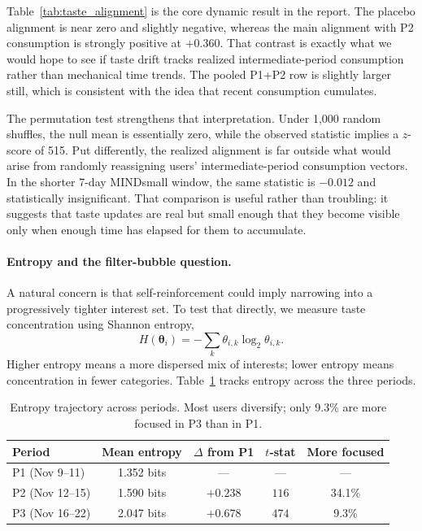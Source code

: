 \documentclass[11pt]{article}
\begin{document}
Table~\ref{tab:taste_alignment} is the core dynamic result in the report. The placebo alignment is near zero and slightly negative, whereas the main alignment with P2 consumption is strongly positive at $+0.360$. That contrast is exactly what we would hope to see if taste drift tracks realized intermediate-period consumption rather than mechanical time trends. The pooled P1+P2 row is slightly larger still, which is consistent with the idea that recent consumption cumulates.

The permutation test strengthens that interpretation. Under 1,000 random shuffles, the null mean is essentially zero, while the observed statistic implies a $z$-score of 515. Put differently, the realized alignment is far outside what would arise from randomly reassigning users' intermediate-period consumption vectors. In the shorter 7-day MINDsmall window, the same statistic is $-0.012$ and statistically insignificant. That comparison is useful rather than troubling: it suggests that taste updates are real but small enough that they become visible only when enough time has elapsed for them to accumulate.

\paragraph{Entropy and the filter-bubble question.}
A natural concern is that self-reinforcement could imply narrowing into a progressively tighter interest set. To test that directly, we measure taste concentration using Shannon entropy,
\[
H(\boldsymbol{\theta}_i) = -\sum_k \theta_{i,k}\log_2 \theta_{i,k}.
\]
Higher entropy means a more dispersed mix of interests; lower entropy means concentration in fewer categories. Table~\ref{tab:entropy} tracks entropy across the three periods.

\begin{table}[ht]
\centering
\caption{Entropy trajectory across periods. Most users diversify; only 9.3\% are more focused in P3 than in P1.}
\label{tab:entropy}
\begin{tabular}{lcccc}
\toprule
Period & Mean entropy & $\Delta$ from P1 & $t$-stat & More focused \\
\midrule
P1 (Nov 9--11) & 1.352 bits & --- & --- & --- \\
P2 (Nov 12--15) & 1.590 bits & $+0.238$ & $116$ & 34.1\% \\
P3 (Nov 16--22) & 2.047 bits & $+0.678$ & $474$ & 9.3\% \\
\bottomrule
\end{tabular}
\end{table}
\FloatBarrier
\end{document}
